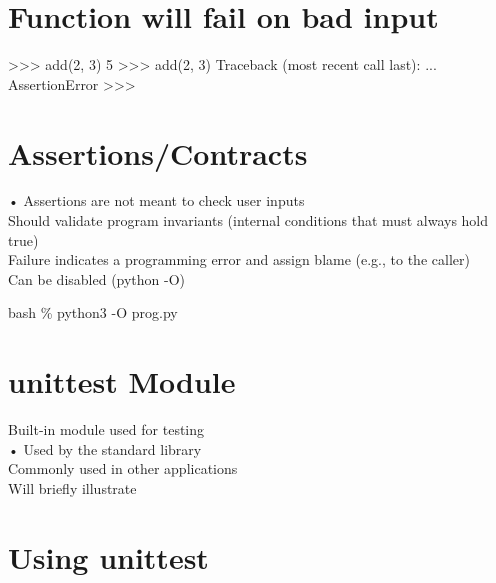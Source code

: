 \documentclass[
  letterpaper,
  DIV=11,
  numbers=noendperiod]{scrreprt}
\newenvironment{Shaded}{\begin{snugshade}}{\end{snugshade}}
\newcommand{\NormalTok}[1]{\textcolor[rgb]{0.00,0.23,0.31}{#1}}
\begin{document}

\chapter{Function will fail on bad
input}\label{function-will-fail-on-bad-input}

\begin{Shaded}
\begin{Highlighting}[]
\NormalTok{\textgreater{}\textgreater{}\textgreater{} add(2, 3)  }
\NormalTok{5  }
\NormalTok{\textgreater{}\textgreater{}\textgreater{} add(\textquotesingle{}2\textquotesingle{}, \textquotesingle{}3\textquotesingle{})  }
\NormalTok{Traceback (most recent call last):  }
\NormalTok{...  }
\NormalTok{AssertionError  }
\NormalTok{\textgreater{}\textgreater{}\textgreater{} }
\end{Highlighting}
\end{Shaded}


\chapter{Assertions/Contracts}\label{assertionscontracts-1}

• Assertions are not meant to check user inputs\\
Should validate program invariants (internal conditions that must always
hold true)\\
Failure indicates a programming error and assign blame (e.g., to the
caller)\\
Can be disabled (python -O)

bash \% python3 -O prog.py


\chapter{unittest Module}\label{unittest-module}

Built-in module used for testing\\
• Used by the standard library\\
Commonly used in other applications\\
Will briefly illustrate


\chapter{Using unittest}\label{using-unittest}
\end{document}
